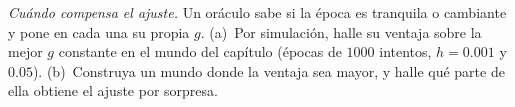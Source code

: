 \begin{exercise}[\lvlC]
\label{ex:08:7}
\emph{Cuándo compensa el ajuste.} Un oráculo sabe si la época es tranquila o cambiante y pone en cada una su propia $g$. (a)~Por simulación, halle su ventaja sobre la mejor $g$ constante en el mundo del capítulo (épocas de $1000$ intentos, $h=0.001$ y $0.05$). (b)~Construya un mundo donde la ventaja sea mayor, y halle qué parte de ella obtiene el ajuste por sorpresa.
\end{exercise}
